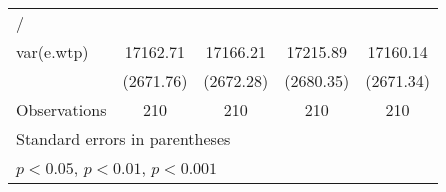 \begin{table}[htbp]
\begin{tabular}{l*{4}{c}}
\hline
/               &                  &                  &                  &                  \\
var(e.wtp)      & 17162.71\sym{***}& 17166.21\sym{***}& 17215.89\sym{***}& 17160.14\sym{***}\\
                &(2671.76)         &(2672.28)         &(2680.35)         &(2671.34)         \\
\hline
Observations    &      210         &      210         &      210         &      210         \\
\hline\hline
\multicolumn{5}{l}{\footnotesize Standard errors in parentheses}\\
\multicolumn{5}{l}{\footnotesize \sym{*} \(p<0.05\), \sym{**} \(p<0.01\), \sym{***} \(p<0.001\)}\\
\end{tabular}
\end{table}
